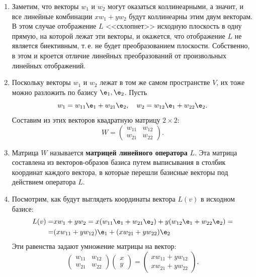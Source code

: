 \begin{enumerate}
\item Заметим, что векторы $w_1$ и $w_2$ могут оказаться коллинеарными, а значит, и все линейные комбинации $xw_1+yw_2$ будут коллинеарны этим двум векторам. В этом случае отображение $L$ <<схлопнет>> исходную плоскость в одну прямую, на которой лежат эти векторы, и окажется, что отображение $L$ не является биективным, т.\,е. не будет преобразованием плоскости. Собственно, в этом и кроется отличие линейных преобразований от произвольных линейных отображений.
\item Поскольку векторы $w_1$ и $w_2$ лежат в том же самом пространстве $V$, их тоже можно разложить по базису $\e_1,\e_2$. Пусть
$$
w_1=w_{11}\e_1+w_{21}\e_2,\quad w_2=w_{12}\e_1+w_{22}\e_2.
$$
Составим из этих векторов квадратную матрицу $2\times 2$:
$$
W = \begin{pmatrix}
w_{11} & w_{12} \\ w_{21} & w_{22}
\end{pmatrix}.
$$

\item Матрица $W$ называется \textbf{матрицей линейного оператора} $L$. Эта матрица составлена из векторов-образов базиса путем выписывания в столбик координат каждого вектора, в которые перешли базисные векторы под действием оператора $L$.
\item Посмотрим, как будут выглядеть координаты вектора $L(v)$ в исходном базисе:
\begin{align*}
L(v)= & xw_1+yw_2 = x(w_{11}\e_1+w_{21}\e_2)+y(w_{12}\e_1+w_{22}\e_2)= \\
= & (xw_{11}+yw_{12})\e_1+(xw_{21}+yw_{22})\e_2
\end{align*}
Эти равенства задают умножение матрицы на вектор:
$$
\begin{pmatrix}
w_{11} & w_{12} \\ w_{21} & w_{22}
\end{pmatrix}
\begin{pmatrix}
x  \\ y
\end{pmatrix} =
\begin{pmatrix}
xw_{11}+yw_{12}  \\ xw_{21}+yw_{22}
\end{pmatrix}.
$$


\end{enumerate}
